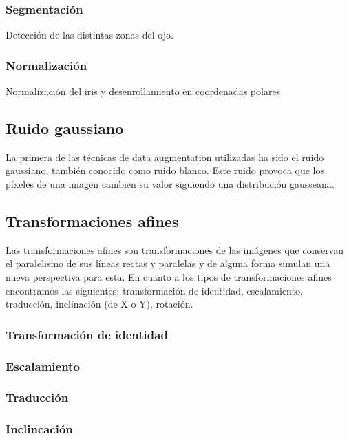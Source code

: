\subsubsection{Segmentación}

Detección de las distintas zonas del ojo.

\subsubsection{Normalización}

Normalización del iris y desenrollamiento en coordenadas polares

\subsection{Ruido gaussiano}

La primera de las técnicas de data augmentation utilizadas ha sido el ruido gaussiano, también conocido como ruido blanco. Este ruido provoca que los píxeles de una imagen cambien
su valor siguiendo una distribución gausseana.

\subsection{Transformaciones afines}

Las transformaciones afines son transformaciones de las imágenes que conservan el paralelismo de sus líneas rectas y paralelas y de alguna forma simulan una nueva perspectiva para esta.
En cuanto a los tipos de transformaciones afines encontramos las siguientes: transformación de identidad, escalamiento, traducción, inclinación (de X o Y), rotación.

\subsubsection{Transformación de identidad}

\subsubsection{Escalamiento}

\subsubsection{Traducción}

\subsubsection{Inclincación}

